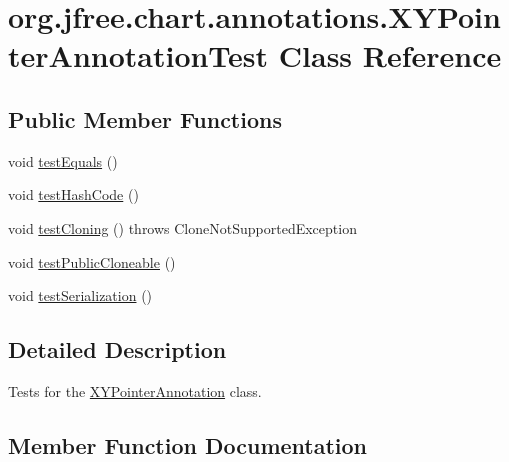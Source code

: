 \hypertarget{classorg_1_1jfree_1_1chart_1_1annotations_1_1_x_y_pointer_annotation_test}{}\section{org.\+jfree.\+chart.\+annotations.\+X\+Y\+Pointer\+Annotation\+Test Class Reference}
\label{classorg_1_1jfree_1_1chart_1_1annotations_1_1_x_y_pointer_annotation_test}
\subsection*{Public Member Functions}
\begin{DoxyCompactItemize}
\item 
void \mbox{\hyperlink{classorg_1_1jfree_1_1chart_1_1annotations_1_1_x_y_pointer_annotation_test_aabe58651632c9d4a8c9f011fbea12083}{test\+Equals}} ()
\item 
void \mbox{\hyperlink{classorg_1_1jfree_1_1chart_1_1annotations_1_1_x_y_pointer_annotation_test_add3317d5348eb580d40d1f413e480ba2}{test\+Hash\+Code}} ()
\item 
void \mbox{\hyperlink{classorg_1_1jfree_1_1chart_1_1annotations_1_1_x_y_pointer_annotation_test_ab541fdfaacc522aa71d56de4d097bac0}{test\+Cloning}} ()  throws Clone\+Not\+Supported\+Exception 
\item 
void \mbox{\hyperlink{classorg_1_1jfree_1_1chart_1_1annotations_1_1_x_y_pointer_annotation_test_a44d14e91a1afa939b18c5bea31a9ed6b}{test\+Public\+Cloneable}} ()
\item 
void \mbox{\hyperlink{classorg_1_1jfree_1_1chart_1_1annotations_1_1_x_y_pointer_annotation_test_a6eab193bc6937640860519a3dd65c684}{test\+Serialization}} ()
\end{DoxyCompactItemize}


\subsection{Detailed Description}
Tests for the \mbox{\hyperlink{classorg_1_1jfree_1_1chart_1_1annotations_1_1_x_y_pointer_annotation}{X\+Y\+Pointer\+Annotation}} class. 

\subsection{Member Function Documentation}
\mbox{\label{classorg_1_1jfree_1_1chart_1_1annotations_1_1_x_y_pointer_annotation_test_ab541fdfaacc522aa71d56de4d097bac0}} 
